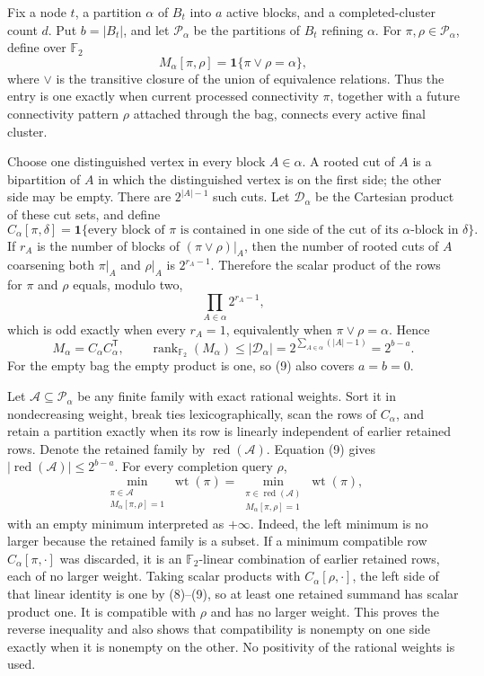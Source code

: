 Fix a node \(t\), a partition \(\alpha\) of \(B_t\) into \(a\) active blocks, and a completed-cluster count \(d\).  Put \(b=|B_t|\), and let \(\mathscr P_\alpha\) be the partitions of \(B_t\) refining \(\alpha\).  For \(\pi,\rho\in\mathscr P_\alpha\), define over \(\mathbb F_2\)
\[
 M_\alpha[\pi,\rho]
 =\mathbf 1\{\pi\vee\rho=\alpha\},
\tag{8}
\]
where \(\vee\) is the transitive closure of the union of equivalence relations.  Thus the entry is one exactly when current processed connectivity \(\pi\), together with a future connectivity pattern \(\rho\) attached through the bag, connects every active final cluster.

Choose one distinguished vertex in every block \(A\in\alpha\).  A rooted cut of \(A\) is a bipartition of \(A\) in which the distinguished vertex is on the first side; the other side may be empty.  There are \(2^{|A|-1}\) such cuts.  Let \(\mathscr D_\alpha\) be the Cartesian product of these cut sets, and define
\[
 C_\alpha[\pi,\delta]
 =\mathbf 1\{\text{every block of \(\pi\) is contained in one side
 of the cut of its \(\alpha\)-block in \(\delta\)}\}.
\]
If \(r_A\) is the number of blocks of \((\pi\vee\rho)|_A\), then the number of rooted cuts of \(A\) coarsening both \(\pi|_A\) and \(\rho|_A\) is \(2^{r_A-1}\).  Therefore the scalar product of the rows for \(\pi\) and \(\rho\) equals, modulo two,
\[
 \prod_{A\in\alpha}2^{r_A-1},
\]
which is odd exactly when every \(r_A=1\), equivalently when \(\pi\vee\rho=\alpha\).  Hence
\[
 M_\alpha=C_\alpha C_\alpha^{\mathsf T},
 \qquad
 \operatorname{rank}_{\mathbb F_2}(M_\alpha)
 \le |\mathscr D_\alpha|
 =2^{\sum_{A\in\alpha}(|A|-1)}=2^{b-a}.
\tag{9}
\]
For the empty bag the empty product is one, so (9) also covers \(a=b=0\).

Let \(\mathscr A\subseteq\mathscr P_\alpha\) be any finite family with exact rational weights.  Sort it in nondecreasing weight, break ties lexicographically, scan the rows of \(C_\alpha\), and retain a partition exactly when its row is linearly independent of earlier retained rows.  Denote the retained family by \(\operatorname{red}(\mathscr A)\).  Equation (9) gives \(|\operatorname{red}(\mathscr A)|\le2^{b-a}\).  For every completion query \(\rho\),
\[
 \min_{\substack{\pi\in\mathscr A\\M_\alpha[\pi,\rho]=1}}
 \operatorname{wt}(\pi)
 =
 \min_{\substack{\pi\in\operatorname{red}(\mathscr A)\\
                   M_\alpha[\pi,\rho]=1}}
 \operatorname{wt}(\pi),
\tag{10}
\]
with an empty minimum interpreted as \(+\infty\).  Indeed, the left minimum is no larger because the retained family is a subset.  If a minimum compatible row \(C_\alpha[\pi,\cdot]\) was discarded, it is an \(\mathbb F_2\)-linear combination of earlier retained rows, each of no larger weight.  Taking scalar products with \(C_\alpha[\rho,\cdot]\), the left side of that linear identity is one by (8)--(9), so at least one retained summand has scalar product one.  It is compatible with \(\rho\) and has no larger weight.  This proves the reverse inequality and also shows that compatibility is nonempty on one side exactly when it is nonempty on the other.  No positivity of the rational weights is used.

